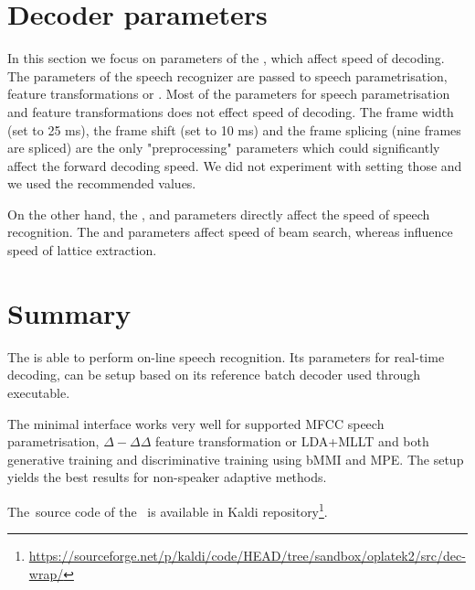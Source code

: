 \section{Decoder parameters}
\label{sec:real-setup}

In this section we focus on parameters of the ,
which affect speed of decoding.
The parameters of the speech recognizer are passed to speech parametrisation, feature transformations or .
Most of the parameters for speech parametrisation and feature transformations does not effect speed of decoding. 
The frame width (set to 25 ms), the frame shift (set to 10 ms) and the frame splicing (nine frames are spliced) are the only "preprocessing" parameters which could significantly affect the forward decoding speed.
We did not experiment with setting those and we used the recommended values.

On the other hand, the ,  and  parameters directly affect the speed of speech recognition. 
The  and  parameters affect speed of beam search, whereas  influence speed of lattice extraction.

\section{Summary}
\label{sec:onl_summary}
The  is able to perform on-line speech recognition.
Its parameters for real-time decoding, can be setup based on its reference batch decoder  used through  executable.

The minimal interface works very well for supported \ac{MFCC} speech parametrisation, $\Delta-\Delta\Delta$ feature transformation or \ac{LDA}+\ac{MLLT}
and both generative training and discriminative training using \ac{bMMI} and \ac{MPE}.
The setup yields the best results for non-speaker adaptive methods.

The~source code of the~ is available in Kaldi repository\footnote{\url{https://sourceforge.net/p/kaldi/code/HEAD/tree/sandbox/oplatek2/src/dec-wrap/}}.

% 

